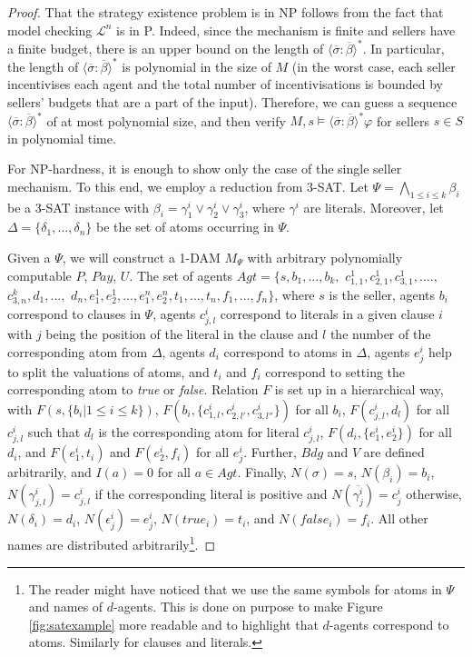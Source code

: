 \documentclass[letterpaper]{article} %
\theoremstyle{definition}
\newcommand{\Pay}{\mathit{Pay}}
\begin{document}
\begin{proof}
    That the strategy existence problem is in NP follows from the fact that model checking $\mathcal{L}^n$ is in P. Indeed, since the mechanism is finite and sellers have a finite budget, there is an upper bound on the length of $\langle \overline{\sigma}: \overline{\beta} \rangle^\ast$. In particular, the length of $\langle \overline{\sigma}: \overline{\beta} \rangle^\ast$ is polynomial in the size of $M$ (in the worst case, each seller incentivises each agent and the total number of incentivisations is bounded by sellers' budgets that are a part of the input). Therefore, we can guess a sequence $\langle \overline{\sigma}: \overline{\beta} \rangle^\ast$ of at most polynomial size, and then verify $M,s \models \langle \overline{\sigma}: \overline{\beta} \rangle^\ast \varphi$ for sellers $s \in S$ in polynomial time.

    For NP-hardness, it is enough to show only the case of the single seller mechanism. To this end, we employ a reduction from 3-SAT. Let $\Psi = \bigwedge_{1 \leqslant i \leqslant k} \beta_i$ be a 3-SAT instance with $\beta_i = \gamma^i_1 \lor \gamma^i_2 \lor \gamma^i_3$, where $\gamma^i$ are literals. Moreover, let $\Delta = \{\delta_1,..., \delta_n\}$ be the set of atoms occurring in $\Psi$.

    Given a $\Psi$, we will construct a 1-DAM $M_\Psi$ with arbitrary polynomially computable $P$, $\Pay$, $U$. The set of agents $Agt = \{s, b_1,...,b_k,$ $c^1_{1,1}, c^1_{2,1}, c^1_{3, 1}, ....,$ $c^k_{3, n}, d_1,...,$ $d_n, e^1_1, e^1_2, ..., e^n_1, e^n_2, t_1, ..., t_n, f_1, ..., f_n\}$, where $s$ is the seller, agents $b_i$ correspond to clauses in $\Psi$, agents $c^i_{j,l}$ correspond to literals in a given clause $i$ with $j$ being the position of the literal in the clause and $l$ the number of the corresponding atom from $\Delta$, agents $d_i$ correspond to atoms in $\Delta$, agents $e^i_j$ help to split the valuations of atoms, and $t_i$ and $f_i$ correspond to setting the corresponding atom to \textit{true} or \textit{false}. Relation $F$ is set up in a hierarchical way, with $F(s, \{b_i | 1 \leqslant i \leqslant k\})$, $F(b_i, \{c^i_{1,l}, c^i_{2,l'}, c^i_{3,l''}\})$ for all $b_i$, $F(c^i_{j,l}, d_l)$ for all $c^i_{j,l}$ such that $d_l$ is the corresponding atom for literal $c^i_{j,l}$, $F(d_i, \{e^i_1, e^i_2\})$ for all $d_i$, and $F(e^i_1, t_i)$ and $F(e^i_2, f_i)$ for all $e^i_j$. Further, $Bdg$ and $V$ are defined arbitrarily, and $I(a) = 0$ for all $a\in Agt$. Finally, $N(\sigma) = s$, $N(\beta_i) = b_i$, $N(\gamma^i_{j,l}) = c^i_{j,l}$ if the corresponding literal is positive and $N(\overline{\gamma^i_j}) = c^i_j$ otherwise, $N(\delta_i) = d_i$, $N(\epsilon^i_j) = e^i_j$,  $N(true_i) = t_i$, and $N(false_i) = f_i$. All other names are distributed arbitrarily\footnote{The reader might have noticed that we use the same symbols for atoms in $\Psi$ and names of $d$-agents. This is done on purpose to make Figure \ref{fig:satexample} more readable and to highlight that $d$-agents correspond to atoms. Similarly for clauses and literals.}.


\end{proof}
\end{document}
